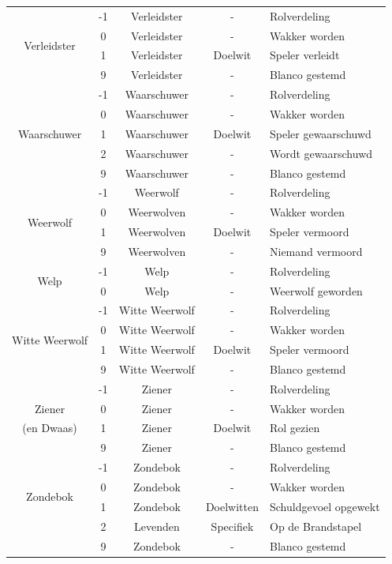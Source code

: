 \documentclass[12pt]{article}
\begin{document}
\begin{center}
\begin{longtable}{c|c|c|c|l}
      \hline
      \multirow{4}{*}{Verleidster} & -1 & Verleidster & - & Rolverdeling \\
       & 0 & Verleidster & - & Wakker worden \\
       & 1 & Verleidster & Doelwit & Speler verleidt \\
       & 9 & Verleidster & - & Blanco gestemd \\
      \hline
      \multirow{5}{*}{Waarschuwer} & -1 & Waarschuwer & - & Rolverdeling \\
       & 0 & Waarschuwer & - & Wakker worden \\
       & 1 & Waarschuwer & Doelwit & Speler gewaarschuwd \\
       & 2 & Waarschuwer & - & Wordt gewaarschuwd \\
       & 9 & Waarschuwer & - & Blanco gestemd \\
      \hline
      \multirow{4}{*}{Weerwolf} & -1 & Weerwolf & - & Rolverdeling \\
       & 0 & Weerwolven & - & Wakker worden \\
       & 1 & Weerwolven & Doelwit & Speler vermoord \\
       & 9 & Weerwolven & - & Niemand vermoord \\
      \hline
      \multirow{2}{*}{Welp} & -1 & Welp & - & Rolverdeling \\
       & 0 & Welp & - & Weerwolf geworden \\
      \hline
      \multirow{4}{*}{Witte Weerwolf} & -1 & Witte Weerwolf & - & Rolverdeling \\
       & 0 & Witte Weerwolf & - & Wakker worden \\
       & 1 & Witte Weerwolf & Doelwit & Speler vermoord \\
       & 9 & Witte Weerwolf & - & Blanco gestemd \\
      \hline
       & -1 & Ziener & - & Rolverdeling \\
      Ziener & 0 & Ziener & - & Wakker worden \\
      (en Dwaas) & 1 & Ziener & Doelwit & Rol gezien \\
       & 9 & Ziener & - & Blanco gestemd \\
      \hline
      \multirow{4}{*}{Zondebok} & -1 & Zondebok & - & Rolverdeling \\
       & 0 & Zondebok & - & Wakker worden \\
       & 1 & Zondebok & Doelwitten & Schuldgevoel opgewekt \\
       & 2 & Levenden & Specifiek & Op de Brandstapel \\
       & 9 & Zondebok & - & Blanco gestemd \\
    \end{longtable}
  \end{center}
\end{document}
